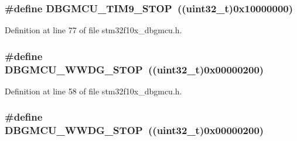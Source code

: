 \subsubsection[{\texorpdfstring{D\+B\+G\+M\+C\+U\+\_\+\+T\+I\+M9\+\_\+\+S\+T\+OP}{DBGMCU_TIM9_STOP}}]{\setlength{\rightskip}{0pt plus 5cm}\#define D\+B\+G\+M\+C\+U\+\_\+\+T\+I\+M9\+\_\+\+S\+T\+OP~(({\bf uint32\+\_\+t})0x10000000)}\hypertarget{group___d_b_g_m_c_u___exported___constants_ga560c557a0d0839dba04f7f2b47851109}{}\label{group___d_b_g_m_c_u___exported___constants_ga560c557a0d0839dba04f7f2b47851109}


Definition at line 77 of file stm32f10x\+\_\+dbgmcu.\+h.

\subsubsection[{\texorpdfstring{D\+B\+G\+M\+C\+U\+\_\+\+W\+W\+D\+G\+\_\+\+S\+T\+OP}{DBGMCU_WWDG_STOP}}]{\setlength{\rightskip}{0pt plus 5cm}\#define D\+B\+G\+M\+C\+U\+\_\+\+W\+W\+D\+G\+\_\+\+S\+T\+OP~(({\bf uint32\+\_\+t})0x00000200)}\hypertarget{group___d_b_g_m_c_u___exported___constants_ga9ecfb95a943e2ad165395fff4fa12770}{}\label{group___d_b_g_m_c_u___exported___constants_ga9ecfb95a943e2ad165395fff4fa12770}


Definition at line 58 of file stm32f10x\+\_\+dbgmcu.\+h.

\subsubsection[{\texorpdfstring{D\+B\+G\+M\+C\+U\+\_\+\+W\+W\+D\+G\+\_\+\+S\+T\+OP}{DBGMCU_WWDG_STOP}}]{\setlength{\rightskip}{0pt plus 5cm}\#define D\+B\+G\+M\+C\+U\+\_\+\+W\+W\+D\+G\+\_\+\+S\+T\+OP~(({\bf uint32\+\_\+t})0x00000200)}\hypertarget{group___d_b_g_m_c_u___exported___constants_ga9ecfb95a943e2ad165395fff4fa12770}{}\label{group___d_b_g_m_c_u___exported___constants_ga9ecfb95a943e2ad165395fff4fa12770}


